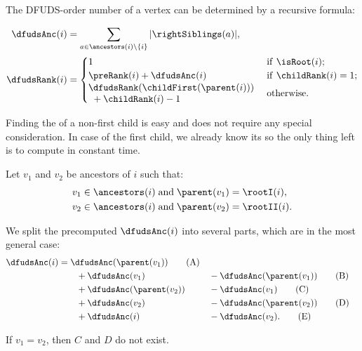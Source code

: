 \begin{lemma}
	The DFUDS-order number of a vertex can be determined by a recursive formula:

	\begin{align*}
		\dfudsAnc(i) &= \sum_{a \in \ancestors(i) \setminus \{i\}} |\rightSiblings(a)|, \\
		\dfudsRank(i) &=
		\begin{cases}
			1 & \textif \isRoot(i); \\
			\preRank(i) + \dfudsAnc(i)  & \textif \childRank(i) = 1; \\
			\!\begin{aligned}
				&\dfudsRank(\childFirst(\parent(i))) \\
				&\ + \childRank(i) - 1
			\end{aligned} & \textotherwise.
		\end{cases}
	\end{align*}
\end{lemma}

Finding the \dfudsRank{} of a non-first child is easy and does not require any special consideration.
In case of the first child, we already know its \preRank{} so the only thing left is to compute \dfudsAnc{} in constant time.

Let $v_1$ and $v_2$ be ancestors of $i$ such that:
\begin{align*}
	v_1 \in \ancestors(i) &\booland \parent(v_1) = \rootI(i), \\
	v_2 \in \ancestors(i) &\booland \parent(v_2) = \rootII(i).
\end{align*}

We split the precomputed $\dfudsAnc(i)$ into several parts, which are in the most general case:
\begin{alignat}{2}
	\dfudsAnc(i) &= \dfudsAnc(\parent(v_1)) \tag{A}\\
	&\qquad + \dfudsAnc(v_1) &&- \dfudsAnc(\parent(v_1)) \tag{B}\\
	&\qquad + \dfudsAnc(\parent(v_2)) &&- \dfudsAnc(v_1) \tag{C}\\
	&\qquad + \dfudsAnc(v_2) &&- \dfudsAnc(\parent(v_2)) \tag{D}\\
	&\qquad + \dfudsAnc(i) &&- \dfudsAnc(v_2). \tag{E}
\end{alignat}

If $v_1 = v_2$, then $C$ and $D$ do not exist.


